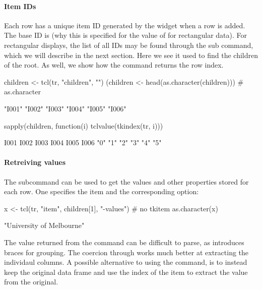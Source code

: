 \paragraph{Item IDs}
Each row has a unique item ID generated by the widget when a row is
added. The base ID is \qcode{} (why this is specified for the value of
 for rectangular data). For rectangular displays, the
list of all IDs may be found through the 
sub command, which we will describe in the next section.  Here we see
it used to find the children of the root. As well, we show how the
 command returns the row index.
\begin{Schunk}
\begin{Sinput}
 children <- tcl(tr, "children", "")
 (children <- head(as.character(children)))     # as.character
\end{Sinput}
\begin{Soutput}
[1] "I001" "I002" "I003" "I004" "I005" "I006"
\end{Soutput}
\begin{Sinput}
 sapply(children, function(i) tclvalue(tkindex(tr, i)))
\end{Sinput}
\begin{Soutput}
I001 I002 I003 I004 I005 I006 
 "0"  "1"  "2"  "3"  "4"  "5" 
\end{Soutput}
\end{Schunk}

\paragraph{Retreiving values}
The  subcommand can be used to get the
values and other properties stored for each row. One specifies the item and the
corresponding option:
\begin{Schunk}
\begin{Sinput}
 x <- tcl(tr, "item", children[1], "-values") # no tkitem
 as.character(x)
\end{Sinput}
\begin{Soutput}
[1] "University of Melbourne"
\end{Soutput}
\end{Schunk}
The value returned from the  command can be difficult to parse, as \TCL\/ introduces braces for grouping. The coercion through  works much better at extracting the individaul columns. A possible alternative to using the  command, is to instead keep the original data frame and use the index of the item to extract the value from the original.


